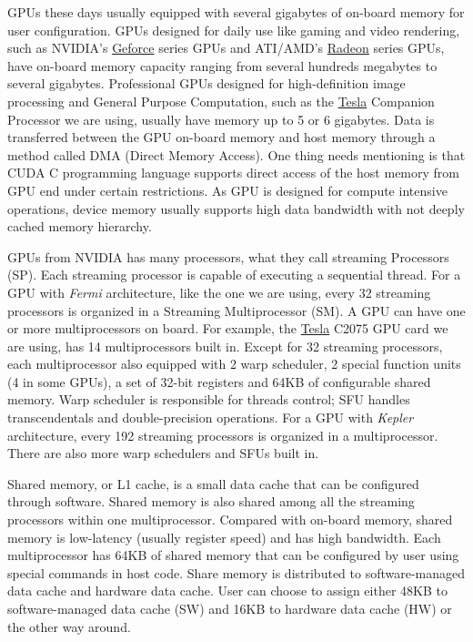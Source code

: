 \documentclass[letterpaper,10pt,english]{sphinxmanual}
\begin{document}
GPUs these days usually equipped with several gigabytes of on-board memory for user configuration. GPUs designed for daily use like gaming and video rendering, such as NVIDIA's \href{http://www.nvidia.com/object/geforce\_family.html}{Geforce} series GPUs and ATI/AMD's \href{http://www.amd.com/us/products/desktop/graphics/pages/desktop-graphics.aspx}{Radeon} series GPUs, have on-board memory capacity ranging from several hundreds megabytes to several gigabytes. Professional GPUs designed for high-definition image processing and General Purpose Computation, such as the \href{http://www.nvidia.com/object/tesla-supercomputing-solutions.html}{Tesla} Companion Processor we are using, usually have memory up to 5 or 6 gigabytes. Data is transferred between the GPU on-board memory and host memory through a method called DMA (Direct Memory Access). One thing needs mentioning is that CUDA C programming language supports direct access of the host memory from GPU end under certain restrictions. As GPU is designed for compute intensive operations, device memory usually supports high data bandwidth with not deeply cached memory hierarchy.

GPUs from NVIDIA has many processors, what they call streaming Processors (SP). Each streaming processor is capable of executing a sequential thread. For a GPU with \emph{Fermi} architecture, like the one we are using, every 32 streaming processors is organized in a Streaming Multiprocessor (SM). A GPU can have one or more multiprocessors on board. For example, the \href{http://www.nvidia.com/object/tesla-supercomputing-solutions.html}{Tesla} C2075 GPU card we are using, has 14 multiprocessors built in. Except for 32 streaming processors, each multiprocessor also equipped with 2 warp scheduler, 2 special function units (4 in some GPUs), a set of 32-bit registers and 64KB of configurable shared memory. Warp scheduler is responsible for threads control; SFU handles transcendentals and double-precision operations. For a GPU with \emph{Kepler} architecture, every 192 streaming processors is organized in a multiprocessor. There are also more warp schedulers and SFUs built in.

Shared memory, or L1 cache, is a small data cache that can be configured through software. Shared memory is also shared among all the streaming processors within one multiprocessor. Compared with on-board memory, shared memory is low-latency (usually register speed) and has high bandwidth. Each multiprocessor has 64KB of shared memory that can be configured by user using special commands in host code. Share memory is distributed to software-managed data cache and hardware data cache. User can choose to assign either 48KB to software-managed data cache (SW) and 16KB to hardware data cache (HW) or the other way around.
\end{document}
